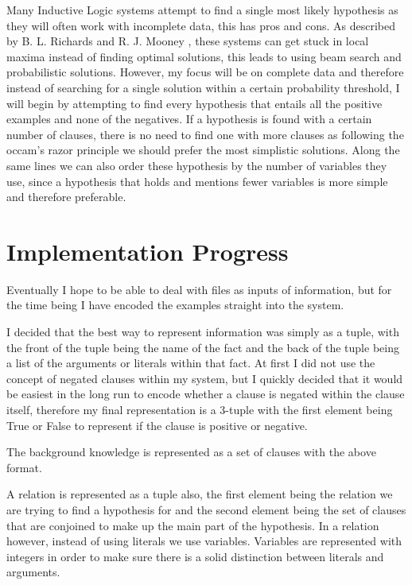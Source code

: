 \documentclass{article}
\begin{document}
Many Inductive Logic systems attempt to find a single most likely hypothesis as
they will often work with incomplete data, this has pros and cons. As described
by B. L. Richards and R. J. Mooney \cite{lrp}, these systems can get stuck in
local maxima instead of finding optimal solutions, this leads to using beam
search and probabilistic solutions. However, my focus will be on complete data
and therefore instead of searching for a single solution within a certain
probability threshold, I will begin by attempting to find every hypothesis that
entails all the positive examples and none of the negatives. If a hypothesis
is found with a certain number of clauses, there is no need to find one with
more clauses as following the occam's razor principle we should prefer the most
simplistic solutions. Along the same lines we can also order these hypothesis
by the number of variables they use, since a hypothesis that holds and mentions
fewer variables is more simple and therefore preferable.

\section*{Implementation Progress}

Eventually I hope to be able to deal with files as inputs of information, but
for the time being I have encoded the examples straight into the system.

I decided that the best way to represent information was simply as a tuple,
  with the front of the tuple being the name of the fact and the back of the
  tuple being a list of the arguments or literals within that fact. At first I
  did not use the concept of negated clauses within my system, but I quickly
  decided that it would be easiest in the long run to encode whether a clause
  is negated within the clause itself, therefore my final representation is a
  3-tuple with the first element being True or False to represent if the clause
  is positive or negative.

The background knowledge is represented as a set of clauses with the above
format. 

A relation is represented as a tuple also, the first element being the relation
we are trying to find a hypothesis for and the second element being the set of
clauses that are conjoined to make up the main part of the hypothesis. In a
relation however, instead of using literals we use variables. Variables are
represented with integers in order to make sure there is a solid distinction
between literals and arguments.
\end{document}
